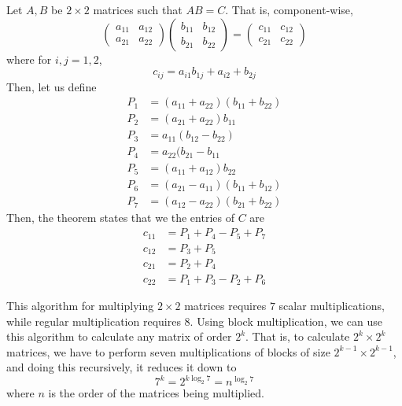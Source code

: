   \begin{algo}
    Let $A, B$ be $2 \times 2$ matrices such that $AB = C$. That is, component-wise,
    \begin{equation}
      \begin{pmatrix}
      a_{11} & a_{12} \\ a_{21} & a_{22}
      \end{pmatrix} \begin{pmatrix}
      b_{11} & b_{12} \\ b_{21} & b_{22}
      \end{pmatrix}
       = \begin{pmatrix}
        c_{11} & c_{12} \\ c_{21} & c_{22}
       \end{pmatrix}
    \end{equation}
    where for $i, j = 1, 2$, 
    \begin{equation}
      c_{ij} = a_{i1} b_{1j} + a_{i2} + b_{2j}
    \end{equation}
    Then, let us define 
    \begin{align*}
      P_1 &= (a_{11} + a_{22}) (b_{11} + b_{22}) \\
      P_2 &= (a_{21} + a_{22}) b_{11} \\
      P_3 &= a_{11} (b_{12} - b_{22}) \\
      P_4 &= a_{22} (b_{21} - b_{11} \\
      P_5 &= (a_{11} + a_{12}) b_{22} \\
      P_6 &= (a_{21} - a_{11}) (b_{11} + b_{12}) \\
      P_7 &= (a_{12} - a_{22}) (b_{21} + b_{22}) 
    \end{align*}
    Then, the theorem states that we the entries of $C$ are 
    \begin{align*}
      c_{11} &= P_1 + P_4 - P_5 + P_7 \\
      c_{12} &= P_3 + P_5 \\
      c_{21} &= P_2 + P_4 \\
      c_{22} &= P_1 + P_3 - P_2 + P_6
    \end{align*}

		This algorithm for multiplying $2\times 2$ matrices requires $7$ scalar multiplications, while regular multiplication requires $8$. Using block multiplication, we can use this algorithm to calculate any matrix of order $2^k$. That is, to calculate $2^k \times 2^k$ matrices, we have to perform seven multiplications of blocks of size $2^{k-1} \times 2^{k-1}$, and doing this recursively, it reduces it down to 
		\begin{equation}
			7^k = 2^{k \log_2{7}} = n^{\log_2{7}}
		\end{equation}
		where $n$ is the order of the matrices being multiplied. 


\end{algo}
